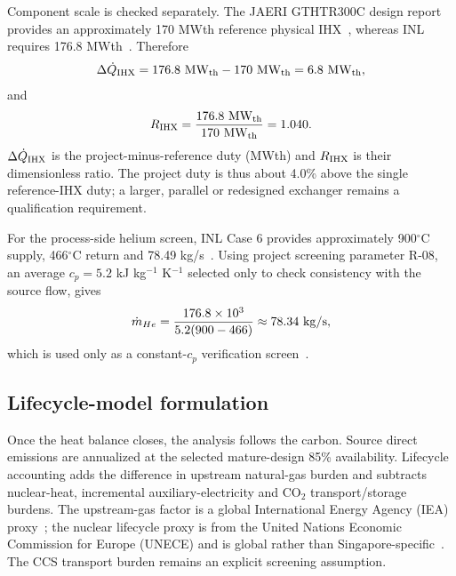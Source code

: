 Component scale is checked separately. The JAERI GTHTR300C design report provides an approximately 170 MWth reference physical IHX~\cite{jaeri2004gthtr300c}, whereas INL requires 176.8 MWth~\cite{inltev961}. Therefore
\begin{equation}\label{eq:ihx-duty-gap}
\Delta \dot Q_{\rm IHX}=176.8~\mathrm{MW_{th}}-170~\mathrm{MW_{th}}=6.8~\mathrm{MW_{th}},
\end{equation}
and
\begin{equation}\label{eq:ihx-duty-ratio}
R_{\rm IHX}=\frac{176.8~\mathrm{MW_{th}}}{170~\mathrm{MW_{th}}}=1.040.
\end{equation}
$\Delta\dot Q_{\rm IHX}$ is the project-minus-reference duty (MWth) and $R_{\rm IHX}$ is their dimensionless ratio. The project duty is thus about 4.0\% above the single reference-IHX duty; a larger, parallel or redesigned exchanger remains a qualification requirement.

For the process-side helium screen, INL Case 6 provides approximately 900$^\circ$C supply, 466$^\circ$C return and 78.49 kg/s~\cite{inltev961}. Using project screening parameter R-08, an average $c_p=5.2$ kJ kg$^{-1}$ K$^{-1}$ selected only to check consistency with the source flow, gives
\begin{equation}\label{eq:helium-flow-check}
\dot m_{He}=\frac{176.8\times10^3}{5.2(900-466)}\approx78.34\ {\rm kg/s},
\end{equation}
which is used only as a constant-$c_p$ verification screen~\cite{inltev961}.



\subsection{Lifecycle-model formulation}
Once the heat balance closes, the analysis follows the carbon. Source direct emissions are annualized at the selected mature-design 85\% availability. Lifecycle accounting adds the difference in upstream natural-gas burden and subtracts nuclear-heat, incremental auxiliary-electricity and CO$_2$ transport/storage burdens. The upstream-gas factor is a global International Energy Agency (IEA) proxy~\cite{iea2026lng}; the nuclear lifecycle proxy is from the United Nations Economic Commission for Europe (UNECE) and is global rather than Singapore-specific~\cite{unece2022lca}. The CCS transport burden remains an explicit screening assumption.

